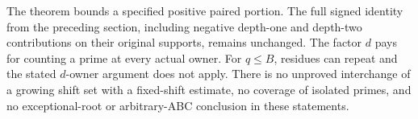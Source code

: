 The theorem bounds a specified positive paired portion. The full signed
identity from the preceding section, including negative depth-one and
depth-two contributions on their original supports, remains unchanged.
The factor \(d\) pays for counting a prime at every actual owner.
For \(q\le B\), residues can repeat and the stated \(d\)-owner argument
does not apply. There is no unproved interchange of a growing shift set
with a fixed-shift estimate, no coverage of isolated primes, and no
exceptional-root or arbitrary-ABC conclusion in these statements.
